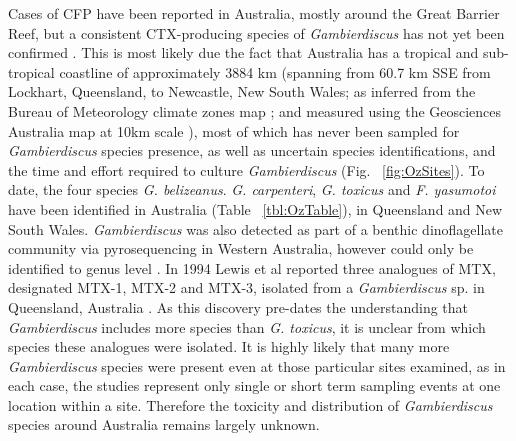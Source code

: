 \documentclass[12pt]{article}
\begin{document}
 
Cases of CFP have been reported in Australia, mostly around the Great Barrier Reef, but a consistent CTX-producing species of \emph{Gambierdiscus} has not yet been confirmed \citep{lewis2006ciguatera}. This is most likely due the fact that Australia has a tropical and sub-tropical coastline of  approximately 3884 km (spanning from 60.7 km SSE from Lockhart, Queensland, to Newcastle, New South Wales; as inferred from the Bureau of Meteorology  climate zones map \citep{climateozmap}; and measured using the Geosciences Australia map at 10km scale \citep{meassureozmap}), most of which has never been sampled for \textit{Gambierdiscus} species presence, as well as uncertain species identifications, and the time and effort required to  culture \textit{Gambierdiscus}  (Fig. ~\ref{fig:OzSites}). To date,  the four species \emph{G. belizeanus}. \emph{G. carpenteri}, \emph{G. toxicus} and \emph{F. yasumotoi} have been identified in Australia (Table ~\ref{tbl:OzTable}), in Queensland and New South Wales. \emph{Gambierdiscus} was also detected as part of a benthic dinoflagellate community via pyrosequencing in Western Australia, however could only be identified to genus level \citep{kohli2014cob}.
In 1994 Lewis et al reported three analogues of MTX, designated MTX-1, MTX-2 and MTX-3, isolated from a \emph{Gambierdiscus} sp. in Queensland, Australia \citep{holmes1994purification}. As this discovery pre-dates the understanding that \emph{Gambierdiscus} includes more species than \emph{G. toxicus}, it is unclear from which species these analogues were isolated.  
It is highly likely that many more \emph{Gambierdiscus} species were present even at those particular sites examined, as in each case, the studies represent only single or short term sampling events at one location within a site. Therefore the toxicity and distribution of \emph{Gambierdiscus} species around Australia remains largely unknown. %
\end{document}

